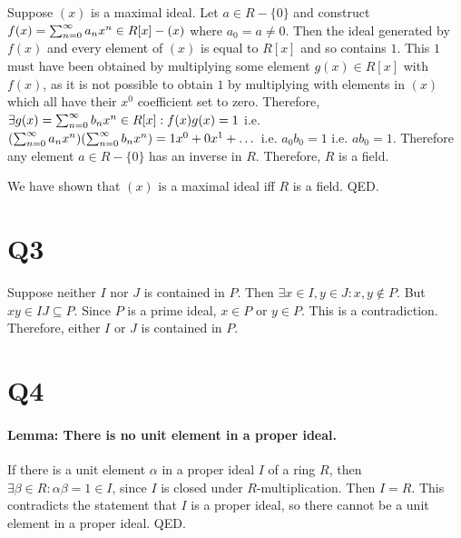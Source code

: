 \documentclass[]{article}
\begin{document}
	Suppose $(x)$ is a maximal ideal.\newline
	Let $a \in R-\{0\}$ and construct $f(x) = \sum_{n = 0}^{\infty} a_nx^n \in R[x]-(x)$ where $a_0 = a \not= 0$.\newline
	Then the ideal generated by $f(x)$ and every element of $(x)$ is equal to $R[x]$ and so contains $1$.\newline
	This $1$ must have been obtained by multiplying some element $g(x) \in R[x]$ with $f(x)$, as it is not possible to obtain $1$ by multiplying with elements in $(x)$ which all have their $x^0$ coefficient set to zero.\newline
	Therefore, $\exists g(x) = \sum_{n = 0}^{\infty} b_nx^n \in R[x]: f(x)g(x) = 1$ i.e. $(\sum_{n = 0}^{\infty} a_nx^n)(\sum_{n = 0}^{\infty} b_nx^n) = 1x^0 + 0x^1 + \dots$ i.e. $a_0b_0 = 1$ i.e. $ab_0 = 1$.\newline
	Therefore any element $a \in R-\{0\}$ has an inverse in $R$.\newline
	Therefore, $R$ is a field.\newline\newline
	
	We have shown that $(x)$ is a maximal ideal iff $R$ is a field. QED.

\section*{Q3}
	Suppose neither $I$ nor $J$ is contained in $P$.\newline
	Then $\exists x \in I, y \in J: x, y \not\in P$.\newline
	But $xy \in IJ \subseteq P$. Since $P$ is a prime ideal, $x \in P$ or $y \in P$.\newline
	This is a contradiction.\newline
	Therefore, either $I$ or $J$ is contained in $P$.

\section*{Q4}
	\paragraph{Lemma: There is no unit element in a proper ideal.}
	If there is a unit element $\alpha$ in a proper ideal $I$ of a ring $R$, then $\exists \beta \in R: \alpha\beta = 1 \in I$, since $I$ is closed under $R$-multiplication. Then $I = R$. This contradicts the statement that $I$ is a proper ideal, so there cannot be a unit element in a proper ideal. QED.\newline
	
\end{document}
